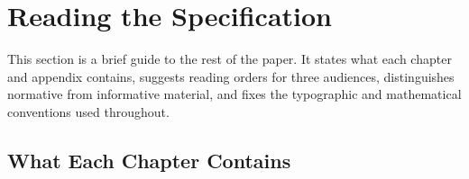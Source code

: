 
\section{Reading the Specification}\label{sec:preamble}

This section is a brief guide to the rest of the paper.
It states what each chapter and appendix contains, suggests reading
  orders for three audiences, distinguishes normative from informative
  material, and fixes the typographic and mathematical conventions used
  throughout.

\subsection{What Each Chapter Contains}\label{sec:preamble:chapters}

